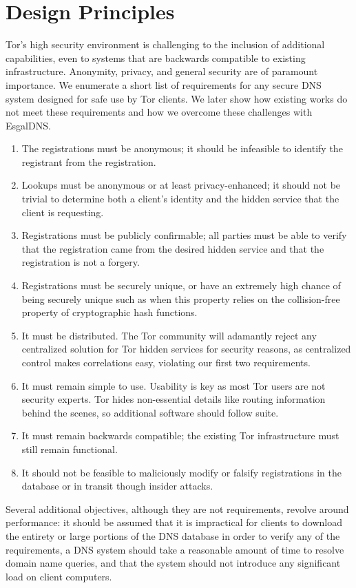 \section{Design Principles}

Tor's high security environment is challenging to the inclusion of additional capabilities, even to systems that are backwards compatible to existing infrastructure. Anonymity, privacy, and general security are of paramount importance. We enumerate a short list of requirements for any secure DNS system designed for safe use by Tor clients. We later show how existing works do not meet these requirements and how we overcome these challenges with EsgalDNS.

\begin{enumerate}
	\item The registrations must be anonymous; it should be infeasible to identify the registrant from the registration.
	\item Lookups must be anonymous or at least privacy-enhanced; it should not be trivial to determine both a client's identity and the hidden service that the client is requesting.
	\item Registrations must be publicly confirmable; all parties must be able to verify that the registration came from the desired hidden service and that the registration is not a forgery. %
	\item Registrations must be securely unique, or have an extremely high chance of being securely unique such as when this property relies on the collision-free property of cryptographic hash functions.
	\item It must be distributed. The Tor community will adamantly reject any centralized solution for Tor hidden services for security reasons, as centralized control makes correlations easy, violating our first two requirements.
	\item It must remain simple to use. Usability is key as most Tor users are not security experts. Tor hides non-essential details like routing information behind the scenes, so additional software should follow suite.
	\item It must remain backwards compatible; the existing Tor infrastructure must still remain functional.
	\item It should not be feasible to maliciously modify or falsify registrations in the database or in transit though insider attacks.
\end{enumerate}

Several additional objectives, although they are not requirements, revolve around performance: it should be assumed that it is impractical for clients to download the entirety or large portions of the DNS database in order to verify any of the requirements, a DNS system should take a reasonable amount of time to resolve domain name queries, and that the system should not introduce any significant load on client computers.
